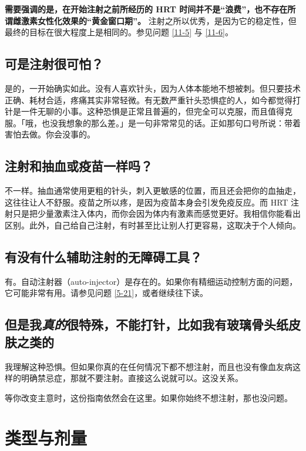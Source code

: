 \documentclass{article}
\begin{document}
\textbf{需要强调的是，在开始注射之前所经历的 HRT 时间并不是“浪费”，也不存在所谓雌激素女性化效果的“黄金窗口期”。} 注射之所以优秀，是因为它的稳定性，但最终的目标在很大程度上是相同的。参见问题 \ref{11-5} 与 \ref{11-6}。

\subsection{可是注射很可怕？}

是的，一开始确实如此。没有人喜欢针头，因为人体本能地不想被刺。但只要技术正确、耗材合适，疼痛其实非常轻微。有无数严重针头恐惧症的人，如今都觉得打针是一件无聊的小事。这种恐惧是正常且普遍的，但完全可以克服，而且值得克服。「哦，也没我想象的那么差。」是一句非常常见的话。正如那句口号所说：带着害怕去做。你会没事的。

\subsection{注射和抽血或疫苗一样吗？}

不一样。抽血通常使用更粗的针头，刺入更敏感的位置，而且还会把你的血抽走，这往往让人不舒服。疫苗之所以疼，是因为疫苗本身会引发免疫反应。而 HRT 注射只是把少量激素注入体内，而你会因为体内有激素而感觉更好。我相信你能看出区别。此外，自己给自己注射，有时甚至比让别人打更容易，这取决于个人倾向。

\subsection{有没有什么辅助注射的无障碍工具？}

有。自动注射器（auto-injector）是存在的。如果你有精细运动控制方面的问题，它可能非常有用。请参见问题 \ref{5-21}，或者继续往下读。

\subsection{但是我\textit{真的}很特殊，不能打针，比如我有玻璃骨头纸皮肤之类的\textemdash{}}

我理解这种恐惧。但如果你真的在任何情况下都不想注射，而且也没有像血友病这样的明确禁忌症，那就不要注射。直接这么说就可以。这没关系。

等你改变主意时，这份指南依然会在这里。如果你始终不想注射，那也没问题。

\section{类型与剂量}\label{td}
\end{document}
